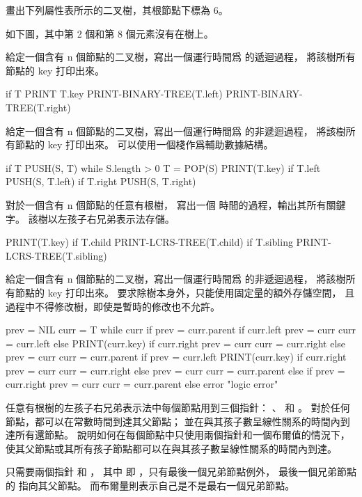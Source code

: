 \startsection[
  title={Representing rooted trees},
]

\startEXERCISE
畫出下列屬性表所示的二叉樹，其根節點下標為 6。


\stopEXERCISE

\startANSWER
如下圖，其中第 2 個和第 8 個元素沒有在樹上。

\externalfigure[output/e10_4_1-1]
\stopANSWER

\startEXERCISE
給定一個含有 n 個節點的二叉樹，寫出一個運行時間爲  的遞迴過程，
將該樹所有節點的 key 打印出來。
\stopEXERCISE

\startCLRS
if T
	PRINT T.key
	PRINT-BINARY-TREE(T.left)
	PRINT-BINARY-TREE(T.right)
\stopCLRS

\startEXERCISE
給定一個含有 n 個節點的二叉樹，寫出一個運行時間爲  的非遞迴過程，
將該樹所有節點的 key 打印出來。
可以使用一個棧作爲輔助數據結構。
\stopEXERCISE

\startCLRS
if T
	PUSH(S, T)
while S.length > 0
	T = POP(S)
	PRINT(T.key)
	if T.left
		PUSH(S, T.left)
	if T.right
		PUSH(S, T.right)
\stopCLRS

\startEXERCISE
對於一個含有 n 個節點的任意有根樹，
寫出一個  時間的過程，輸出其所有關鍵字。
該樹以左孩子右兄弟表示法存儲。
\stopEXERCISE

\startANSWER
{}
\startCLRS
PRINT(T.key)
if T.child
	PRINT-LCRS-TREE(T.child)
if T.sibling
	PRINT-LCRS-TREE(T.sibling)
\stopCLRS
\stopANSWER

\startEXERCISE\DIFFICULT
給定一個含有 n 個節點的二叉樹，寫出一個運行時間爲  的非遞迴過程，
將該樹所有節點的 key 打印出來。
要求除樹本身外，只能使用固定量的額外存儲空間，
且過程中不得修改樹，即使是暫時的修改也不允許。
\stopEXERCISE

\startANSWER
{}
\startCLRS
prev = NIL
curr = T
while curr
	if prev = curr.parent
		if curr.left
			prev = curr
			curr = curr.left
		else
			PRINT(curr.key)
			if curr.right
				prev = curr
				curr = curr.right
			else
				prev = curr
				curr = curr.parent
	if prev = curr.left
		PRINT(curr.key)
		if curr.right
			prev = curr
			curr = curr.right
		else
			prev = curr
			curr = curr.parent
	else if prev = curr.right
		prev = curr
		curr = curr.parent
	else
		error "logic error"
\stopCLRS
\stopANSWER

\startEXERCISE\DIFFICULT
任意有根樹的左孩子右兄弟表示法中每個節點用到三個指針： 、  和 。
對於任何節點，都可以在常數時間到達其父節點；
並在與其孩子數呈線性關系的時間內到達所有還節點。
說明如何在每個節點中只使用兩個指針和一個布爾值的情況下，
使其父節點或其所有孩子節點都可以在與其孩子數呈線性關系的時間內到達。
\stopEXERCISE

\startANSWER
只需要兩個指針  和 ，
其中  即 ，只有最後一個兄弟節點例外，
最後一個兄弟節點的  指向其父節點。
而布爾量則表示自己是不是最右一個兄弟節點。
\stopANSWER

\stopsection
